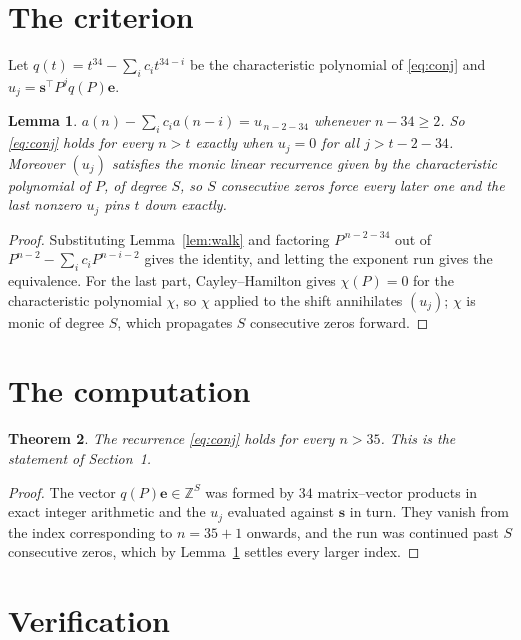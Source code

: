 \documentclass[11pt,a4paper]{article}
\theoremstyle{plain}
\newtheorem{theorem}{Theorem}
\newtheorem{lemma}[theorem]{Lemma}
\theoremstyle{definition}
\begin{document}
\section{The criterion}

Let $q(t)=t^{34}-\sum_i c_i t^{34-i}$ be the characteristic polynomial of
\eqref{eq:conj} and $u_j=\mathbf{s}^{\!\top}P^{j}q(P)\mathbf{e}$.

\begin{lemma}\label{lem:crit}
$a(n)-\sum_i c_i a(n-i)=u_{\,n-2-34}$ whenever $n-34\ge2$. So \eqref{eq:conj}
holds for every $n>t$ exactly when $u_j=0$ for all $j>t-2-34$. Moreover $(u_j)$
satisfies the monic linear recurrence given by the characteristic polynomial of $P$, of
degree $S$, so $S$ consecutive zeros force every later one and the last nonzero $u_j$ pins
$t$ down exactly.
\end{lemma}

\begin{proof}
Substituting Lemma~\ref{lem:walk} and factoring $P^{\,n-2-34}$ out of
$P^{n-2}-\sum_i c_i P^{n-i-2}$ gives the identity, and letting the exponent run gives the
equivalence. For the last part, Cayley--Hamilton gives $\chi(P)=0$ for the characteristic
polynomial $\chi$, so $\chi$ applied to the shift annihilates $(u_j)$; $\chi$ is monic of
degree $S$, which propagates $S$ consecutive zeros forward.
\end{proof}

\section{The computation}

\begin{theorem}
The recurrence \eqref{eq:conj} holds for every $n>35$. This is the statement of
Section~1.
\end{theorem}

\begin{proof}
The vector $q(P)\mathbf{e}\in\mathbb{Z}^{S}$ was formed by $34$ matrix--vector
products in exact integer arithmetic and the $u_j$ evaluated against $\mathbf{s}$ in turn.
They vanish from the index corresponding to $n=35+1$ onwards, and the run was continued
past $S$ consecutive zeros, which by Lemma~\ref{lem:crit} settles every larger index.
\end{proof}

\section{Verification}
\end{document}
